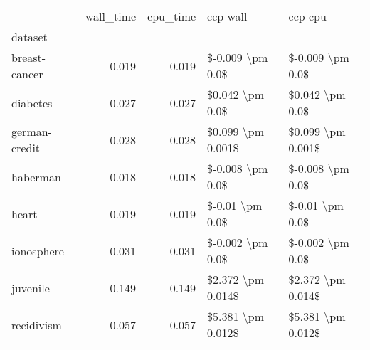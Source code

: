 \begin{tabular}{lrrll}
\toprule
{} &  wall\_time &  cpu\_time &           ccp-wall &            ccp-cpu \\
dataset       &            &           &                    &                    \\
\midrule
breast-cancer &      0.019 &     0.019 &   \$-0.009 \textbackslash pm 0.0\$ &   \$-0.009 \textbackslash pm 0.0\$ \\
diabetes      &      0.027 &     0.027 &    \$0.042 \textbackslash pm 0.0\$ &    \$0.042 \textbackslash pm 0.0\$ \\
german-credit &      0.028 &     0.028 &  \$0.099 \textbackslash pm 0.001\$ &  \$0.099 \textbackslash pm 0.001\$ \\
haberman      &      0.018 &     0.018 &   \$-0.008 \textbackslash pm 0.0\$ &   \$-0.008 \textbackslash pm 0.0\$ \\
heart         &      0.019 &     0.019 &    \$-0.01 \textbackslash pm 0.0\$ &    \$-0.01 \textbackslash pm 0.0\$ \\
ionosphere    &      0.031 &     0.031 &   \$-0.002 \textbackslash pm 0.0\$ &   \$-0.002 \textbackslash pm 0.0\$ \\
juvenile      &      0.149 &     0.149 &  \$2.372 \textbackslash pm 0.014\$ &  \$2.372 \textbackslash pm 0.014\$ \\
recidivism    &      0.057 &     0.057 &  \$5.381 \textbackslash pm 0.012\$ &  \$5.381 \textbackslash pm 0.012\$ \\
\bottomrule
\end{tabular}
